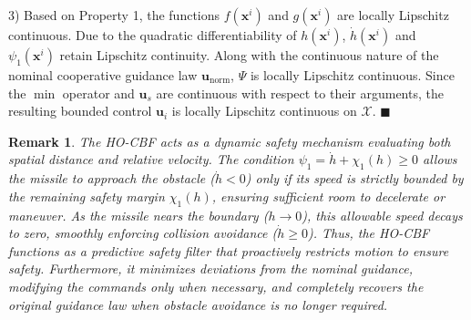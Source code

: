 \documentclass[lettersize,journal]{IEEEtran}
\newtheorem{remark}{Remark}
\begin{document}
3) Based on Property 1, the functions $f(\mathbf{x}^i)$ and $g(\mathbf{x}^i)$ are locally Lipschitz continuous. Due to the quadratic differentiability of $h(\mathbf{x}^i)$, $\dot{h}(\mathbf{x}^i)$ and ${\psi _1}(\mathbf{x}^i)$ retain Lipschitz continuity. Along with the continuous nature of the nominal cooperative guidance law $\mathbf{u}_{\mathrm{norm}}$, $\Psi$ is locally Lipschitz continuous. Since the $\min$ operator and $\mathbf{u}_s$ are continuous with respect to their arguments, the resulting bounded control $\mathbf{u}_i$ is locally Lipschitz continuous on $\mathcal{X}$. \hfill $\blacksquare$














\vspace{1mm}
\begin{remark}
The HO-CBF acts as a dynamic safety mechanism evaluating both spatial distance and relative velocity. The condition $\psi_1 = \dot{h} + {\chi_1}(h) \ge 0$ allows the missile to approach the obstacle ($\dot{h} < 0$) only if its speed is strictly bounded by the remaining safety margin ${\chi_1}(h)$, ensuring sufficient room to decelerate or maneuver. As the missile nears the boundary ($h \to 0$), this allowable speed decays to zero, smoothly enforcing collision avoidance ($\dot{h} \ge 0$). Thus, the HO-CBF functions as a predictive safety filter that proactively restricts motion to ensure safety. Furthermore, it minimizes deviations from the nominal guidance, modifying the commands only when necessary, and completely recovers the original guidance law when obstacle avoidance is no longer required.
\end{remark}
\vspace{1mm}
\end{document}
